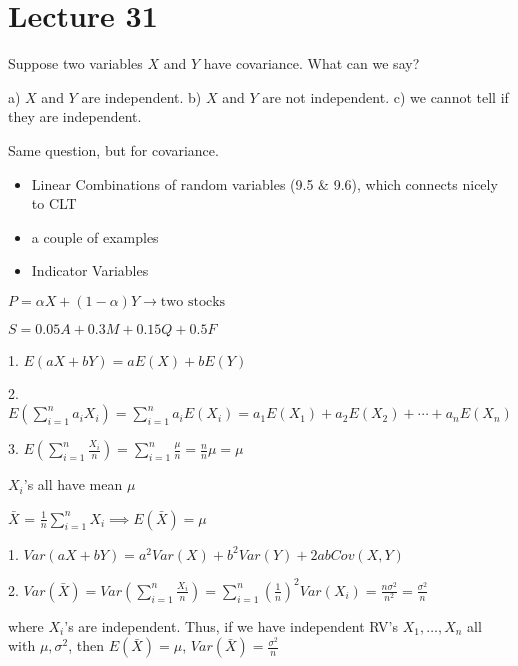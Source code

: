 \section{Lecture 31}

Suppose two variables $ X $ and $ Y $ have  covariance.
What can we say?

a) $ X $ and $ Y $ are independent. b) $ X $ and $ Y $ are not independent.
c) we cannot tell if they are independent.

Same question, but for  covariance.

\begin{itemize}
    \item Linear Combinations of random variables
 (9.5 \& 9.6), which connects nicely to CLT
    \item a couple of examples
\end{itemize}

\begin{itemize}
    \item Indicator Variables
\end{itemize}


$ P=\alpha X+(1-\alpha)Y\rightarrow\text{two stocks} $

$ S=0.05A+0.3M+0.15Q+0.5F $


1. $ E(aX+bY)=aE(X)+bE(Y) $

2. $ E\left(\sum\limits_{i=1}^{n} a_iX_i\right)=\sum\limits_{i=1}^{n}a_i E(X_i)=
a_1E(X_1)+a_2E(X_2)+\cdots +a_nE(X_n) $

3. $ E\left(\sum\limits_{i=1}^{n} \frac{X_i}{n}\right)=\sum\limits_{i=1}^{n}\frac{\mu}{n}=\frac{n}{n} \mu=\mu $

$ X_i $'s all have mean $ \mu $

$ \bar{X} $ = $ \frac{1}{n} \sum\limits_{i=1}^{n} X_i\implies E(\bar{X})=\mu $


1. $ Var(aX+bY)=a^2Var(X)+b^2Var(Y)+2abCov(X,Y) $

2. $ Var(\bar{X})=Var\left(\sum\limits_{i=1}^{n} \frac{X_i}{n}\right)=\sum\limits_{i=1}^{n}\left( \frac{1}{n}  \right)^2
Var(X_i)=\frac{n\sigma^2}{n^2}=\frac{\sigma^2}{n} $

where $ X_i $'s are independent. Thus, if we have independent RV's
$ X_1,\ldots,X_n $ all with $ \mu,\sigma^2 $, then $ E(\bar{X})=\mu $,
$ Var(\bar{X})=\frac{\sigma^2}{n} $

